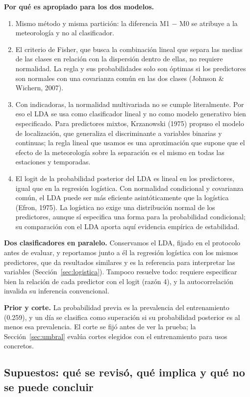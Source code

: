 \textbf{Por qué es apropiado para los dos modelos.}
\begin{enumerate}
\item Mismo método y misma partición: la diferencia M1 − M0 se atribuye a la meteorología y no al clasificador.
\item El criterio de Fisher, que busca la combinación lineal que separa las medias de las clases en relación con la dispersión dentro de ellas, no requiere normalidad. La regla y sus probabilidades solo son óptimas si los predictores son normales con una covarianza común en las dos clases (Johnson \& Wichern, 2007).
\item Con indicadoras, la normalidad multivariada no se cumple literalmente. Por eso el LDA se usa como clasificador lineal y no como modelo generativo bien especificado. Para predictores mixtos, Krzanowski (1975) propuso el modelo de localización, que generaliza el discriminante a variables binarias y continuas; la regla lineal que usamos es una aproximación que supone que el efecto de la meteorología sobre la separación es el mismo en todas las estaciones y temporadas.
\item El logit de la probabilidad posterior del LDA es lineal en los predictores, igual que en la regresión logística. Con normalidad condicional y covarianza común, el LDA puede ser más eficiente asintóticamente que la logística (Efron, 1975). La logística no exige una distribución normal de los predictores, aunque sí especifica una forma para la probabilidad condicional; su comparación con el LDA aporta aquí evidencia empírica de estabilidad.
\end{enumerate}

\textbf{Dos clasificadores en paralelo.} Conservamos el LDA, fijado en el protocolo antes de evaluar, y reportamos junto a él la regresión logística con los mismos predictores, que da resultados similares y es la referencia para interpretar las variables (Sección~\ref{sec:logistica}). Tampoco resuelve todo: requiere especificar bien la relación de cada predictor con el logit (razón 4), y la autocorrelación invalida su inferencia convencional.

\textbf{Prior y corte.} La probabilidad previa es la prevalencia del entrenamiento (0.259), y un día se clasifica como superación si su probabilidad posterior es al menos esa prevalencia. El corte se fijó antes de ver la prueba; la Sección~\ref{sec:umbral} evalúa cortes elegidos con el entrenamiento para usos concretos.

\subsection{Supuestos: qué se revisó, qué implica y qué no se puede concluir}\label{sec:supuestos}

